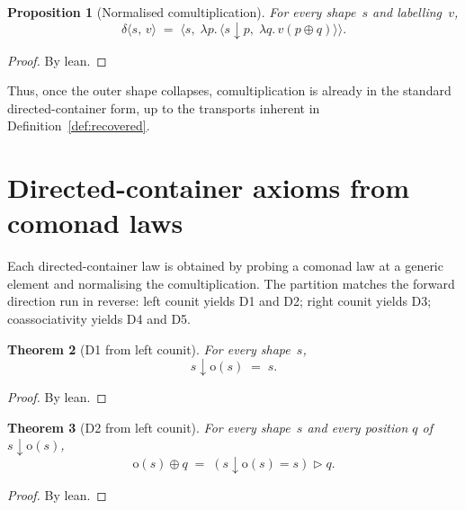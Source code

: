 \documentclass[11pt,a4paper]{article}
\theoremstyle{plain}
\newtheorem{theorem}{Theorem}[section]
\newtheorem{proposition}[theorem]{Proposition}
\theoremstyle{definition}
\newcommand{\rootp}{\mathrm{o}}
\begin{document}
\begin{proposition}[Normalised comultiplication]\label{prop:comult-norm}
For every shape~$s$ and labelling~$v$,
\begin{equation}
  \delta\langle s,\, v\rangle
  \;=\;
  \bigl\langle s,\;
    \lambda p.\,
      \bigl\langle s \downarrow p,\;
        \lambda q.\, v(p \oplus q)\bigr\rangle
  \bigr\rangle.
\end{equation}
\end{proposition}

\begin{proof}
By lean.
\end{proof}

Thus, once the outer shape collapses, comultiplication is already in the
standard directed-container form, up to the transports inherent in
Definition~\ref{def:recovered}.

\section{Directed-container axioms from comonad laws}

Each directed-container law is obtained by probing a comonad law at a generic
element and normalising the comultiplication. The partition matches the
forward direction run in reverse: left counit yields D1 and D2; right counit
yields D3; coassociativity yields D4 and D5.

\begin{theorem}[D1 from left counit]\label{thm:d1}
For every shape~$s$,
\begin{equation}
  s \downarrow \rootp(s) \;=\; s.
\end{equation}
\end{theorem}

\begin{proof}
By lean.
\end{proof}

\begin{theorem}[D2 from left counit]\label{thm:d2}
For every shape~$s$ and every position $q$ of $s \downarrow \rootp(s)$,
\begin{equation}
  \rootp(s) \oplus q \;=\; (s \downarrow \rootp(s) = s) \mathbin{\triangleright} q.
\end{equation}
\end{theorem}

\begin{proof}
By lean.
\end{proof}
\end{document}
